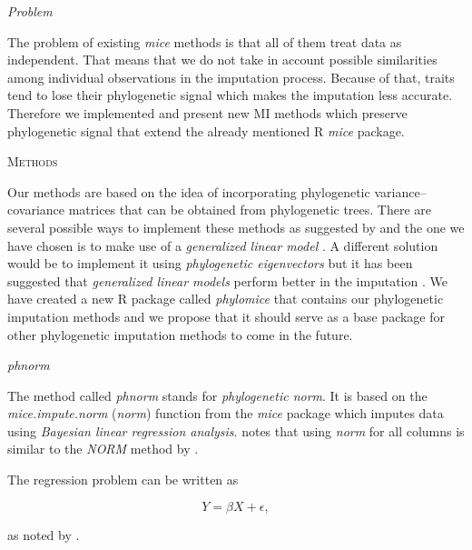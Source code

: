 \documentclass[hidelinks,a4paper]{article}
\renewcommand{\section}[1]{%
\bigskip
\begin{center}
\begin{Large}
\normalfont\scshape #1
\medskip
\end{Large}
\end{center}}
\renewcommand{\subsection}[1]{%
\bigskip
\begin{center}
\begin{large}
\normalfont\itshape #1
\end{large}
\end{center}}
\begin{document}
\begin{multicols}{2}
\subsection{Problem}
The problem of existing \emph{mice} methods is that all of them treat data as independent. That means that we do not take in account possible similarities among individual observations in the imputation process. Because of that, traits tend to lose their phylogenetic signal \cite{blomberg2003testing} which makes the imputation less accurate. Therefore we implemented and present new MI methods which preserve phylogenetic signal that extend the already mentioned R \emph{mice} package.

\section{Methods}
Our methods are based on the idea of incorporating phylogenetic variance--covariance matrices that can be obtained from phylogenetic trees. There are several possible ways to implement these methods as suggested by \cite{swenson2014phylogenetic} and the one we have chosen is to make use of a \emph{generalized linear model} \cite{Garland2000}. A different solution would be to implement it using \emph{phylogenetic eigenvectors} but it has been suggested that \emph{generalized linear models} perform better in the imputation \cite{rohlf2001comparative,freckleton2002phylogenetic}. We have created a new R package called \emph{phylomice} that contains our phylogenetic imputation methods and we propose that it should serve as a base package for other phylogenetic imputation methods to come in the future.

\subsection{phnorm}
The method called \emph{phnorm} stands for \emph{phylogenetic norm}. It is based on the \emph{mice.impute.norm} (\emph{norm}) function from the \emph{mice} package which imputes data using \emph{Bayesian linear regression analysis}. \cite{Buuren2011} notes that using \emph{norm} for all columns is similar to the \emph{NORM} method by \cite{Schafer1997}.

The regression problem can be written as

\begin{equation}
Y = \beta X + \epsilon,
\end{equation}

as noted by \cite{martins1997phylogenies}.


\end{multicols}
\end{document}
